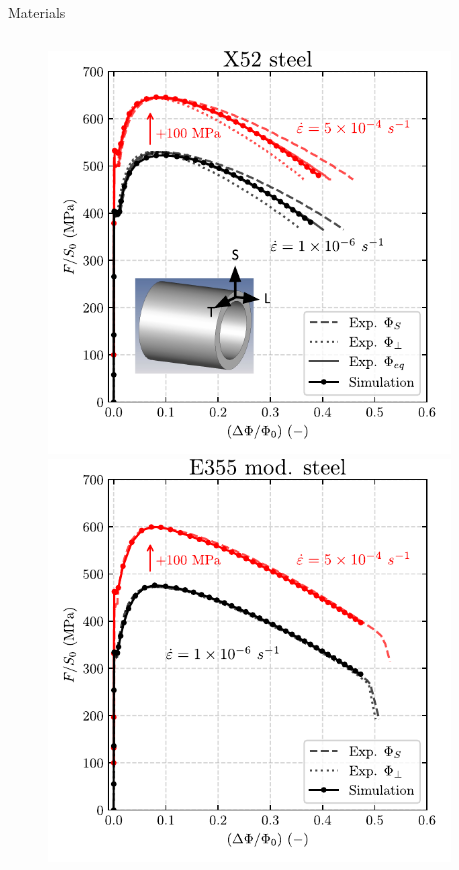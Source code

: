 \documentclass[9pt]{beamer}
\begin{document}
\begin{frame}{Materials}
\begin{columns}
\begin{column}{0.35\textwidth}
	
\begin{figure}
	\centering
	\includegraphics[width=0.95\textwidth]{Images/plot_X52_radial.pdf} \\
	\includegraphics[width=0.95\textwidth]{Images/plot_E355_radial.pdf}
\end{figure}

\end{column}

\end{columns}

\end{frame}
\end{document}
